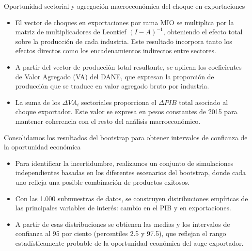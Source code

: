 \documentclass[aspectratio=169,xcolor=dvipsnames]{beamer}
\begin{document}
\begin{frame}{Oportunidad sectorial y agregación macroeconómica del choque en exportaciones}
    \begin{itemize}
        \item El vector de choques en exportaciones por rama MIO se multiplica por la matriz de multiplicadores de Leontief \((I - A)^{-1}\), obteniendo el efecto total sobre la producción de cada industria. Este resultado incorpora tanto los efectos directos como los encadenamientos indirectos entre sectores.
        \item A partir del vector de producción total resultante, se aplican los coeficientes de Valor Agregado (VA) del DANE, que expresan la proporción de producción que se traduce en valor agregado bruto por industria.
        \item La suma de los \(\Delta VA_i\) sectoriales proporciona el \(\Delta PIB\) total asociado al choque exportador. Este valor se expresa en pesos constantes de 2015 para mantener coherencia con el resto del análisis macroeconómico.
    \end{itemize}
\end{frame}

\begin{frame}{Consolidamos los resultados del bootstrap para obtener intervalos de confianza de la oportunidad económica}
    \begin{itemize}
        \item Para identificar la incertidumbre, realizamos un conjunto de simulaciones independientes basadas en los diferentes escenarios del bootstrap, donde cada uno refleja una posible combinación de productos exitosos.
        \item Con las 1.000 submuestras de datos, se construyen distribuciones empíricas de las principales variables de interés: cambio en el PIB y en exportaciones.
        \item A partir de esas distribuciones se obtienen las medias y los intervalos de confianza al 95 por ciento (percentiles 2.5 y 97.5), que reflejan el rango estadísticamente probable de la oportunidad económica del auge exportador.
    \end{itemize}
\end{frame}
\end{document}
